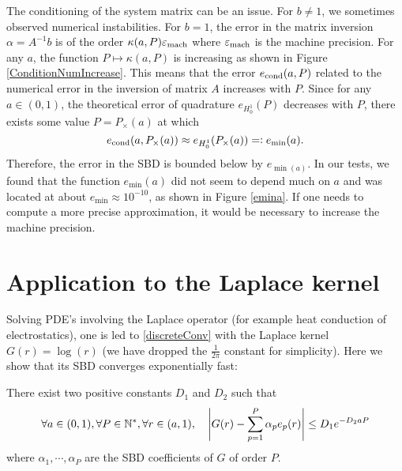 \documentclass[11pt,a4paper]{article}
\begin{document}
\begin{Rem} The conditioning of the system matrix can be an issue. For $b \neq 1$, we sometimes observed numerical instabilities. For $b=1$, the error in the matrix inversion $\alpha = A^{-1}b$ is of the order $\kappa(a,P) \varepsilon_{\textup{mach}}$ where $\varepsilon_{\textup{mach}}$ is the machine precision. For any $a$, the function $P \mapsto \kappa(a,P)$ is increasing as shown in Figure \ref{ConditionNumIncrease}. This means that the error $e_{\textup{cond}}(a,P)$ related to the numerical error in the inversion of matrix $A$ increases with $P$. Since for any $a \in (0,1)$, the theoretical error of quadrature $e_{H_0^1}(P)$ decreases with $P$, there exists some value $P = P_{\times}(a)$ at which 
	\[e_{\textup{cond}}(a,P_{\times}(a)) \approx  e_{H_0^1}(P_{\times}(a)) =\mathrel{\mathop:} e_{\min}(a).\]
	Therefore, the error in the SBD is bounded below by $e_{\min(a)}$. 
	In our tests, we found that the function $e_{\min}(a)$ did not seem to depend much on $a$ and was located at about $e_{\min} \approx 10^{-10}$, as shown in Figure \ref{emina}. If one needs to compute a more precise approximation, it would be necessary to increase the machine precision. 
\end{Rem}

%
%	
%
%	

\section{Application to the Laplace kernel}
\label{sec:ApplicationLaplace}
Solving PDE's involving the Laplace operator (for example heat conduction of electrostatics), one is led to \eqref{discreteConv} with the Laplace kernel $G(r) = \log(r)$ (we have dropped the $\frac{1}{2\pi}$ constant for simplicity). Here we show that its SBD converges exponentially fast:
\begin{The} 
	\label{theRadialQuadLaplaceErreur}
	There exist two positive constants $D_1$ and $D_2$ such that
	\[ \forall a \in (0,1), \forall P \in \mathbb{N}^*, \forall r \in (a,1), \quad \left\lvert G(r) - \sum_{p=1}^P \alpha_p e_p(r) \right\rvert \leq D_1 e^{-D_2 a P} \]
	where $\alpha_1,\cdots,\alpha_P$ are the SBD coefficients of $G$ of order $P$.  
\end{The}
\end{document}
